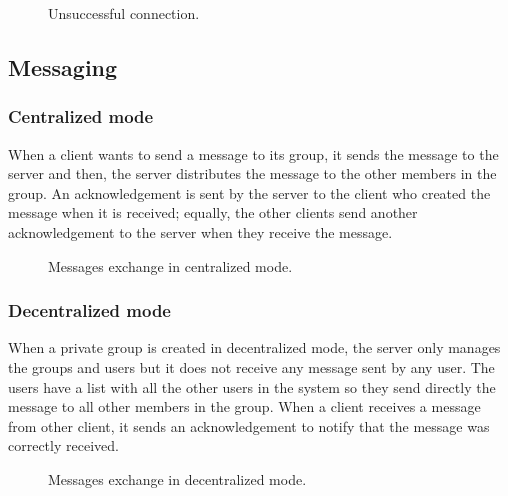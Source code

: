 \documentclass{article}
\begin{document}
\begin{figure}[H]
    \centering
    \begin{sequencediagram}

    \end{sequencediagram}
    \caption{Unsuccessful connection.}
\end{figure}

\subsection{Messaging}
\subsubsection{Centralized mode}
When a client wants to send a message to its group, it sends the message to the server and then, the server distributes the message to the other members in the group. An acknowledgement is sent by the server to the client who created the message when it is received; equally, the other clients send another acknowledgement to the server when they receive the message.
\begin{figure}[H]
    \centering
    \begin{sequencediagram}

    \end{sequencediagram}
    \caption{Messages exchange in centralized mode.}
\end{figure}

\subsubsection{Decentralized mode}
When a private group is created in decentralized mode, the server only manages the groups and users but it does not receive any message sent by any user. The users have a list with all the other users in the system so they send directly the message to all other members in the group. When a client receives a message from other client, it sends an acknowledgement to notify that the message was correctly received.
\begin{figure}[H]
    \centering
    \begin{sequencediagram}

    \end{sequencediagram}
    \caption{Messages exchange in decentralized mode.}
\end{figure}
\end{document}
